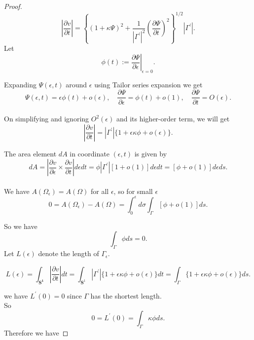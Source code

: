 \documentclass[oneside]{book}
\begin{document}
\begin{proof}
		$$\left|\frac{\partial v}{\partial t}\right|=\left\{(1+\kappa \Psi)^{2}+\frac{1}{\left|\Gamma^{\prime}\right|^{2}}\left(\frac{\partial \Psi}{\partial t}\right)^{2}\right\}^{1 / 2}\left|\Gamma^{\prime}\right|.$$
		Let   
		$$\phi(t):=\left.\frac{\partial \Psi}{\partial \epsilon}\right|_{\epsilon=0}.$$ 
		
		Expanding $\Psi(\epsilon, t)$ around $\epsilon$ using Tailor series expansion we get \\
		
		$$
		\Psi(\epsilon, t)=\epsilon \phi(t)+o(\epsilon), \quad \frac{\partial \Psi}{\partial \epsilon}=\phi(t)+o(1), \quad \frac{\partial \Psi}{\partial t}=O(\epsilon).
		$$ \\
		On simplifying and ignoring $O^2(\epsilon)$ and its higher-order term, we will get 
		$$
		\left|\frac{\partial v}{\partial t}\right|=\left|\Gamma^{\prime}\right|\{1+\epsilon \kappa \phi+o(\epsilon)\}.
		$$ 
		
		The area element $d A$ in coordinate $( \epsilon, t)$   is given by
		\\
		\begin{equation}
			\label{eq13}  
			d A=\left|\frac{\partial v}{\partial \epsilon} \times \frac{\partial v}{\partial t}\right| d \epsilon dt=\phi\left|\Gamma^{\prime}\right|[1+o(1)] d \epsilon d t=[\phi+o(1)] d \epsilon d s.
		\end{equation} \\
		We have $A\left(\Omega_{\epsilon}\right)=A(\Omega)$ for all $\epsilon$, so for small $\epsilon$ \\
		
		$$
		0 = A\left(\Omega_{\epsilon}\right)-A(\Omega)=\int_{0}^{\epsilon} d \sigma \int_{\Gamma}[\phi+o(1)] d s.
		$$
		
		So we have 
		$$  
		\int_{\Gamma} \phi d s=0.
		$$ 
		Let $L(\epsilon)$ denote the length of $\Gamma_{\epsilon} .$  
		
		
		
		$$ L(\epsilon)=\int_{\mathbf{S^1}}\left|\frac{\partial v}{\partial t}\right| d t=\int_{\mathbf{S}^{1}}\left|\Gamma^{\prime}\right|\{1+\epsilon \kappa \phi+o(\epsilon)\} d t=\int_{\Gamma}\{1+\epsilon \kappa \phi+o(\epsilon)\} d s. $$
		
		\hfill \break
		
		we have $L^{\prime}(0)=0$ since $\Gamma$ has the shortest length.
		\\
		So
		$$ 0 = L^{\prime}(0)=\int_{\Gamma} \kappa \phi d s.$$
		Therefore we have 
		

\end{proof}
\end{document}

